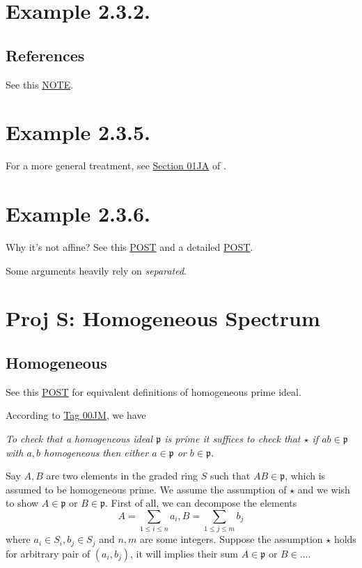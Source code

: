 \section{Example 2.3.2.}

\subsection{References}
See this \href{https://math.mit.edu/~mckernan/Teaching/09-10/Autumn/18.725/l_11.pdf}{NOTE}.

\section{Example 2.3.5.}

For a more general treatment, see \href{https://stacks.math.columbia.edu/tag/01JA}{Section 01JA} of \cite{stacks-project}.

\section{Example 2.3.6.}

Why it's not affine? See this \href{https://mathoverflow.net/questions/87480/explanation-on-a-scheme-which-is-not-affine-scheme}{POST} and a detailed \href{https://math.stackexchange.com/questions/4281800/example-of-scheme-which-is-not-an-affine-scheme}{POST}. 

Some arguments heavily rely on \textit{separated}.

\section{Proj S: Homogeneous Spectrum}

\subsection{Homogeneous}

See this \href{https://math.stackexchange.com/questions/4027174/homogeneous-ideal-in-kx-0-x-n}{POST} for equivalent definitions of homogeneous prime ideal. 

According to \href{https://stacks.math.columbia.edu/tag/00JM}{Tag 00JM}, we have

\textit{To check that a homogeneous ideal $\mathfrak p$ is prime it suffices to check that $\star$ if $ab\in \mathfrak p$ with $a,b$ homogeneous then either $a\in \mathfrak p$ or $b\in \mathfrak p$.}

Say $A,B$ are two elements in the graded ring $S$ such that $AB\in \mathfrak p$, which is assumed to be homogeneous prime. We assume the assumption of $\star$ and we wish to show $A\in\mathfrak p$ or $B\in\mathfrak p$. First of all, we can decompose the elements 
\[A=\sum_{1\leq i\leq n} a_i, B=\sum_{1\leq j\leq m}b_j\] where $a_i\in S_i, b_j\in S_j$ and $n,m$ are some integers. Suppose the assumption $\star$ holds for arbitrary pair of $(a_i,b_j)$, it will implies their sum $A\in \mathfrak p$ or $B\in...$. 

